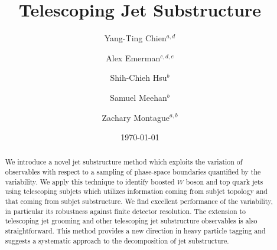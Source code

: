 \documentclass[aps,prl,floatfix,preprintnumbers,twocolumn,groupedaddress,nofootinbib]{revtex4-1}
\begin{document}
\title{Telescoping Jet Substructure}

\author{Yang-Ting Chien$^{a,d}$}

\author{Alex Emerman$^{c,d,e}$}

\author{Shih-Chieh Hsu$^b$}

\author{Samuel Meehan$^b$}

\author{Zachary Montague$^{a,b}$}


\date{\today}
\linenumbers

\begin{abstract}
We introduce a novel jet substructure method which exploits the variation of observables with respect to a sampling of phase-space boundaries quantified by the variability. We apply this technique to identify boosted $W$ boson and top quark jets using telescoping subjets which utilizes information coming from subjet topology and that coming from subjet substructure. We find excellent performance of the variability, in particular its robustness against finite detector resolution. The extension to telescoping jet grooming and other telescoping jet substructure observables is also straightforward. This method provides a new direction in heavy particle tagging and suggests a systematic approach to the decomposition of jet substructure.
\end{abstract}
\maketitle
\end{document}
